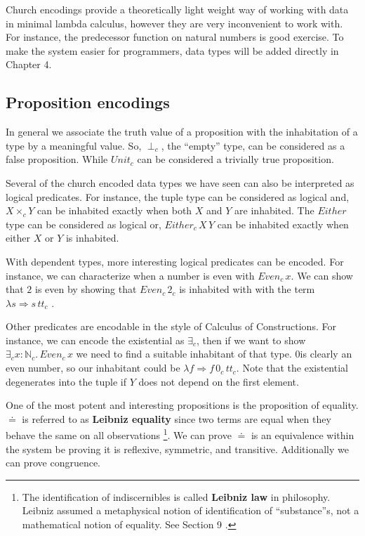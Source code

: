 

Church encodings provide a theoretically light weight way of working
with data in minimal lambda calculus, however they are very inconvenient
to work with. For instance, the predecessor function on natural numbers
is good exercise. To make the system easier for programmers, data
types will be added directly in Chapter 4.

\subsection{Proposition encodings}

In general we associate the truth value of a proposition with the
inhabitation of a type by a meaningful value. So, $\perp_{c}$, the
``empty'' type, can be considered as a false proposition. While
$Unit_{c}$ can be considered a trivially true proposition.

Several of the church encoded data types we have seen can also be
interpreted as logical predicates. For instance, the tuple type can
be considered as logical and, $X\times_{c}Y$ can be inhabited exactly
when both $X$ and $Y$ are inhabited. The $Either$ type can be considered
as logical or, $Either_{c}\,X\,Y$ can be inhabited exactly when either
$X$ or $Y$ is inhabited.

With dependent types, more interesting logical predicates can be encoded.
For instance, we can characterize when a number is even with $Even_{c}\,x$.
We can show that $2$ is even by showing that $Even_{c}\,2_{c}$ is
inhabited with with the term $\lambda s\Rightarrow s\,tt_{c}$ .

Other predicates are encodable in the style of Calculus of Constructions\cite{10.1016/0890-5401(88)90005-3}.
For instance, we can encode the existential as $\exists_{c}$, then
if we want to show $\exists_{c}x:\mathbb{N}_{c}.\,Even_{c}\,x$ we
need to find a suitable inhabitant of that type. $0$is clearly an
even number, so our inhabitant could be $\lambda f\Rightarrow f\,0_{c}\,tt_{c}$.
Note that the existential degenerates into the tuple if $Y$ does
not depend on the first element. 

One of the most potent and interesting propositions is the proposition
of equality. $\doteq$ is referred to as \textbf{Leibniz equality}
since two terms are equal when they behave the same on all observations
\footnote{The identification of indiscernibles is called \textbf{Leibniz law}
in philosophy. Leibniz assumed a metaphysical notion of identification
of ``substance''s, not a mathematical notion of equality. See Section
9 \cite{Leibniz1686}.}. We can prove $\doteq$ is an
equivalence within the system be proving it is reflexive, symmetric,
and transitive. Additionally we can prove congruence.

